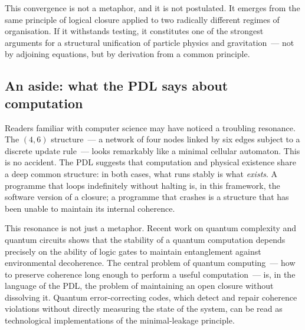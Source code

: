 \documentclass[12pt, a4paper, openright]{book}
\begin{document}
\medskip

This convergence is not a metaphor, and it is not postulated. It emerges from the same principle of logical closure applied to two radically different regimes of organisation. If it withstands testing, it constitutes one of the strongest arguments for a structural unification of particle physics and gravitation~--- not by adjoining equations, but by derivation from a common principle.

\subsection*{An aside: what the PDL says about computation}

Readers familiar with computer science may have noticed a troubling resonance. The $(4,6)$ structure~--- a network of four nodes linked by six edges subject to a discrete update rule~--- looks remarkably like a minimal cellular automaton. This is no accident. The PDL suggests that computation and physical existence share a deep common structure: in both cases, what runs stably is what \emph{exists}. A programme that loops indefinitely without halting is, in this framework, the software version of a closure; a programme that crashes is a structure that has been unable to maintain its internal coherence.

\medskip

This resonance is not just a metaphor. Recent work on quantum complexity and quantum circuits shows that the stability of a quantum computation depends precisely on the ability of logic gates to maintain entanglement against environmental decoherence. The central problem of quantum computing~--- how to preserve coherence long enough to perform a useful computation~--- is, in the language of the PDL, the problem of maintaining an open closure without dissolving it. Quantum error-correcting codes, which detect and repair coherence violations without directly measuring the state of the system, can be read as technological implementations of the minimal-leakage principle.

\medskip
\end{document}
